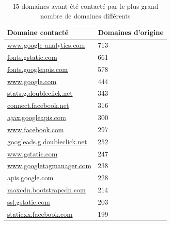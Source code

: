		\begin{table}[]
\centering
\begin{tabular}{ll}
\textbf{Domaine contacté}               & \textbf{Domaines d'origine} \\ \hline
\scriptsize \url{www.google-analytics.com}       & 713                               \\
\scriptsize \url{fonts.gstatic.com}              & 661                               \\
\scriptsize \url{fonts.googleapis.com}           & 578                               \\
\scriptsize \url{www.google.com}                 & 444                               \\
\scriptsize \url{stats.g.doubleclick.net}        & 343                               \\
\scriptsize \url{connect.facebook.net}           & 316                               \\
\scriptsize \url{ajax.googleapis.com}            & 300                               \\
\scriptsize \url{www.facebook.com}               & 297                               \\
\scriptsize \url{googleads.g.doubleclick.net}    & 252                               \\
\scriptsize \url{www.gstatic.com}                & 247                               \\
\scriptsize \url{www.googletagmanager.com}       & 238                               \\
\scriptsize \url{apis.google.com}                & 228                               \\
\scriptsize \url{maxcdn.bootstrapcdn.com}        & 214                               \\
\scriptsize \url{ssl.gstatic.com}                & 203                               \\
\scriptsize \url{staticxx.facebook.com}          & 199                               \\                         
\end{tabular}
\caption{15 domaines ayant été contacté par le plus grand nombre de domaines différents}
\label{trackers-4}
\end{table}
